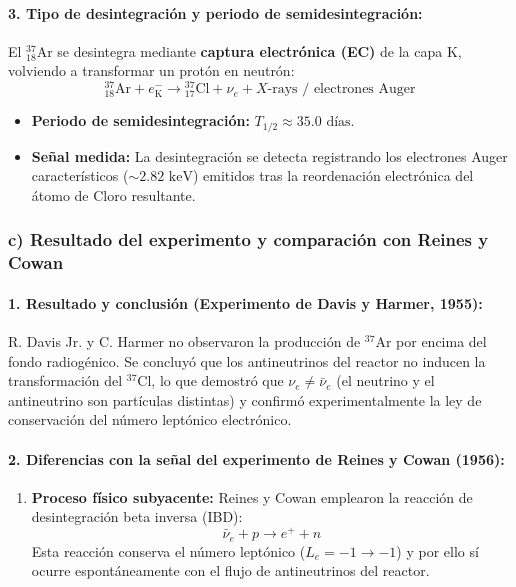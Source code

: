 \begin{problema}
\paragraph{3. Tipo de desintegración y periodo de semidesintegración:}
El ${}^{37}_{18}\text{Ar}$ se desintegra mediante \textbf{captura electrónica (EC)} de la capa K, volviendo a transformar un protón en neutrón:
\begin{equation*}
{}^{37}_{18}\text{Ar} + e^-_{\text{K}} \longrightarrow {}^{37}_{17}\text{Cl} + \nu_e + X\text{-rays / electrones Auger}
\end{equation*}
\begin{itemize}
    \item \textbf{Periodo de semidesintegración:} $T_{1/2} \approx 35.0\text{ días}$.
    \item \textbf{Señal medida:} La desintegración se detecta registrando los electrones Auger característicos ($\sim 2.82\text{ keV}$) emitidos tras la reordenación electrónica del átomo de Cloro resultante.
\end{itemize}

\subsubsection*{c) Resultado del experimento y comparación con Reines y Cowan}

\paragraph{1. Resultado y conclusión (Experimento de Davis y Harmer, 1955):}
R. Davis Jr. y C. Harmer no observaron la producción de ${}^{37}\text{Ar}$ por encima del fondo radiogénico. Se concluyó que los antineutrinos del reactor no inducen la transformación del ${}^{37}\text{Cl}$, lo que demostró que \textbf{$\nu_e \neq \bar{\nu}_e$} (el neutrino y el antineutrino son partículas distintas) y confirmó experimentalmente la ley de conservación del número leptónico electrónico.

\paragraph{2. Diferencias con la señal del experimento de Reines y Cowan (1956):}

\begin{enumerate}[label=\arabic*.]
    \item \textbf{Proceso físico subyacente:} Reines y Cowan emplearon la reacción de desintegración beta inversa (IBD):
    \begin{equation*}
    \bar{\nu}_e + p \longrightarrow e^+ + n
    \end{equation*}
    Esta reacción conserva el número leptónico ($L_e = -1 \to -1$) y por ello sí ocurre espontáneamente con el flujo de antineutrinos del reactor.
    

\end{enumerate}
\end{problema}
